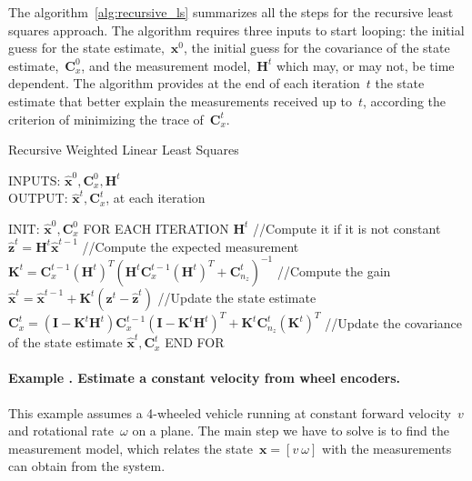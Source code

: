 The algorithm~\ref{alg:recursive_ls} summarizes all the steps for the recursive least squares approach. The algorithm requires three inputs to start looping: the initial guess for the state estimate,~$\mathbf{x}^0$, the initial guess for the covariance of the state estimate,~$\mathbf{C}^0_x$, and the measurement model,~$\mathbf{H}^t$ which may, or may not, be time dependent. The algorithm provides at the end of each iteration~$t$ the state estimate that better explain the measurements received up to~$t$, according the criterion of minimizing the trace of~$\mathbf{C}^t_x$.
\begin{algorithm}
\caption{Recursive Weighted Linear Least Squares}
INPUTS: $\hat{\mathbf{x}}^0,\mathbf{C}^0_x,\mathbf{H}^t$\\
OUTPUT: $\hat{\mathbf{x}}^t,\mathbf{C}^t_x$, at each iteration
\begin{algorithmic}
\STATE INIT: $\hat{\mathbf{x}}^0,\mathbf{C}^0_x$
\STATE FOR EACH ITERATION
\STATE \hspace{1cm} $\mathbf{H}^t$ //Compute it if it is not constant
\STATE \hspace{1cm} $\hat{\mathbf{z}}^t = \mathbf{H}^t\hat{\mathbf{x}}^{t-1}$ //Compute the expected measurement 
\STATE \hspace{1cm} $\mathbf{K}^t = \mathbf{C}^{t-1}_x(\mathbf{H}^t)^T(\mathbf{H}^t\mathbf{C}^{t-1}_x(\mathbf{H}^t)^T+\mathbf{C}^t_{n_z})^{-1}$ 
//Compute the gain
\STATE \hspace{1cm} $\hat{\mathbf{x}}^t = \hat{\mathbf{x}}^{t-1} + \mathbf{K}^t(\mathbf{z}^t - \hat{\mathbf{z}}^t)$ //Update the state estimate
\STATE \hspace{1cm} $\mathbf{C}^t_{x} = (\mathbf{I}-\mathbf{K}^t\mathbf{H}^t)\mathbf{C}^{t-1}_x(\mathbf{I}-\mathbf{K}^t\mathbf{H}^t)^T
		    + \mathbf{K}^t\mathbf{C}^t_{n_z}(\mathbf{K}^t)^T$ //Update the covariance of the state estimate
\RETURN $\hat{\mathbf{x}}^t,\mathbf{C}^t_x$		    
\STATE END FOR
\end{algorithmic}
\label{alg:recursive_ls}
\end{algorithm}

\paragraph{Example \theexamplecounter. Estimate a constant velocity from wheel encoders.}
This example assumes a 4-wheeled vehicle running at constant forward velocity~$v$ and rotational rate~$\omega$ on a plane.
The main step we have to solve is to find the measurement model, which relates the state~$\mathbf{x}=[v\ \omega]$ with the measurements can obtain from the system. 

